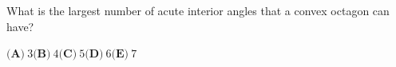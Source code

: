 What is the largest number of acute interior angles that a convex octagon can have?

$\textbf{(A)}\ 3$\qquad$\textbf{(B)}\ 4$\qquad$\textbf{(C)}\ 5$\qquad$\textbf{(D)}\ 6$\qquad$\textbf{(E)}\ 7$
